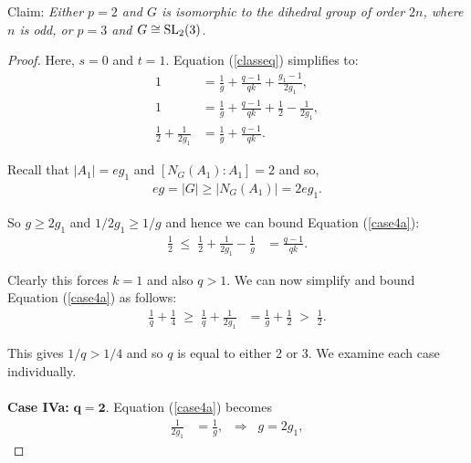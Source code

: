 \begin{theorem}[Case IV]
\label{case_IV}
\leanok
Claim: \textit{Either $p=2$ and $G$ is isomorphic to the dihedral group of order $2n$, where $n$ is odd, or $p=3$ and $G \cong \operatorname{SL}_2(3)$.}
\end{theorem}
\begin{proof} Here, $s = 0$ and $t = 1$. Equation (\ref{classeq}) simplifies to:
\begin{align}\label{case4a} 1 &= \frac{1}{g} + \frac{q-1}{qk} +  \frac{g_1-1}{2g_1}, \nonumber
\\ 1 &= \frac{1}{g} + \frac{q-1}{qk} + \frac{1}{2} - \frac{1}{2g_1}, \nonumber
\\ \frac{1}{2} + \frac{1}{2g_1} &= \frac{1}{g} + \frac{q-1}{qk}.
\end{align}

Recall that $|A_1|=eg_1$ and $[N_G(A_1): A_1] = 2$ and so,
\begin{align*} eg = |G| \geq |N_G(A_1)| = 2eg_1.
\end{align*}

So $g \geq 2g_1$ and $1/2g_1 \geq 1/g$ and hence we can bound Equation (\ref{case4a}):
\begin{align*} \frac{1}{2} \; \leq \; \frac{1}{2} + \frac{1}{2g_1} - \frac{1}{g} &= \frac{q-1}{qk}.
\end{align*}

Clearly this forces $k = 1$ and also $q > 1$. We can now simplify and bound Equation (\ref{case4a}) as follows:
\begin{align*} \frac{1}{q} + \frac{1}{4} \; \geq \; \frac{1}{q} + \frac{1}{2g_1} &= \frac{1}{g} + \frac{1}{2} \; > \; \frac{1}{2}. 
\end{align*}

This gives $1/q > 1/4$ and so $q$ is equal to either 2 or 3. We examine each case individually. \\
\\
 \space \textbf{Case IVa:} $\pmb{q = 2}$. Equation (\ref{case4a}) becomes
\begin{align*} \frac{1}{2g_1} &= \frac{1}{g}, \; \; \Longrightarrow \; \; g = 2g_1,
\end{align*}


\end{proof}
